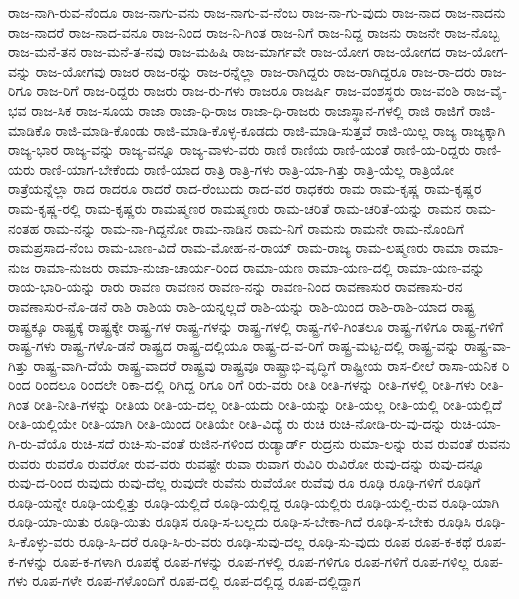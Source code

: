 {ರಾಜ-ನಾಗಿ-ರುವ-ನೆಂದೂ
ರಾಜ-ನಾಗು-ವನು
ರಾಜ-ನಾಗು-ವ-ನೆಂಬ
ರಾಜ-ನಾ-ಗು-ವುದು
ರಾಜ-ನಾದ
ರಾಜ-ನಾದನು
ರಾಜ-ನಾದರೆ
ರಾಜ-ನಾದ-ವನೂ
ರಾಜ-ನಿಂದ
ರಾಜ-ನಿ-ಗಿಂತ
ರಾಜ-ನಿಗೆ
ರಾಜ-ನಿದ್ದ
ರಾಜನು
ರಾಜನೇ
ರಾಜ-ನೊಬ್ಬ
ರಾಜ-ಮನೆ-ತನ
ರಾಜ-ಮನೆ-ತ-ನವು
ರಾಜ-ಮಹಿಷಿ
ರಾಜ-ಮಾರ್ಗವೇ
ರಾಜ-ಯೋಗ
ರಾಜ-ಯೋಗದ
ರಾಜ-ಯೋಗ-ವನ್ನು
ರಾಜ-ಯೋಗವು
ರಾಜರ
ರಾಜ-ರನ್ನು
ರಾಜ-ರನ್ನೆಲ್ಲಾ
ರಾಜ-ರಾಗಿದ್ದರು
ರಾಜ-ರಾಗಿದ್ದರೂ
ರಾಜ-ರಾ-ದರು
ರಾಜ-ರಿಗೂ
ರಾಜ-ರಿಗೆ
ರಾಜ-ರಿದ್ದರು
ರಾಜರು
ರಾಜ-ರು-ಗಳು
ರಾಜರೂ
ರಾಜರ್ಷಿ
ರಾಜ-ವಂಶಸ್ಥರು
ರಾಜ-ವಂಶಿ
ರಾಜ-ವೈ-ಭವ
ರಾಜ-ಸಿಕ
ರಾಜ-ಸೂಯ
ರಾಜಾ
ರಾಜಾ-ಧಿ-ರಾಜ
ರಾಜಾ-ಧಿ-ರಾಜರು
ರಾಜಾಸ್ಥಾನ-ಗಳಲ್ಲಿ
ರಾಜಿ
ರಾಜಿಗೆ
ರಾಜಿ-ಮಾಡಿಕೊ
ರಾಜಿ-ಮಾಡಿ-ಕೊಂಡು
ರಾಜಿ-ಮಾಡಿ-ಕೊಳ್ಳ-ಕೂಡದು
ರಾಜಿ-ಮಾಡಿ-ಸುತ್ತವೆ
ರಾಜಿ-ಯಿಲ್ಲ
ರಾಜ್ಯ
ರಾಜ್ಯಕ್ಕಾಗಿ
ರಾಜ್ಯ-ಭಾರ
ರಾಜ್ಯ-ವನ್ನು
ರಾಜ್ಯ-ವನ್ನೂ
ರಾಜ್ಯ-ವಾಳು-ವರು
ರಾಣಿ
ರಾಣಿಯ
ರಾಣಿ-ಯಂತೆ
ರಾಣಿ-ಯ-ರಿದ್ದರು
ರಾಣಿ-ಯರು
ರಾಣಿ-ಯಾಗ-ಬೇಕೆಂದು
ರಾಣಿ-ಯಾದ
ರಾತ್ರಿ
ರಾತ್ರಿ-ಗಳು
ರಾತ್ರಿ-ಯಾ-ಗಿತ್ತು
ರಾತ್ರಿ-ಯೆಲ್ಲ
ರಾತ್ರಿಯೋ
ರಾತ್ರೆಯನ್ನೆಲ್ಲಾ
ರಾದ
ರಾದರೂ
ರಾದರೆ
ರಾದ-ರೆಂಬುದು
ರಾದ-ವರ
ರಾಧಕರು
ರಾಮ
ರಾಮ-ಕೃಷ್ಣ
ರಾಮ-ಕೃಷ್ಣರ
ರಾಮ-ಕೃಷ್ಣ-ರಲ್ಲಿ
ರಾಮ-ಕೃಷ್ಣರು
ರಾಮಷ್ಮಣರ
ರಾಮಷ್ಮಣರು
ರಾಮ-ಚರಿತೆ
ರಾಮ-ಚರಿತೆ-ಯನ್ನು
ರಾಮನ
ರಾಮ-ನಂತಹ
ರಾಮ-ನನ್ನು
ರಾಮ-ನಾ-ಗಿದ್ದನೋ
ರಾಮ-ನಾಡಿನ
ರಾಮ-ನಿಗೆ
ರಾಮನು
ರಾಮನೇ
ರಾಮ-ನೊಂದಿಗೆ
ರಾಮಪ್ರಸಾದ-ನೆಂಬ
ರಾಮ-ಬಾಣ-ವಿದೆ
ರಾಮ-ಮೋಹ-ನ-ರಾಯ್
ರಾಮ-ರಾಜ್ಯ
ರಾಮ-ಲಷ್ಮಣರು
ರಾಮಾ
ರಾಮಾ-ನುಜ
ರಾಮಾ-ನುಜರು
ರಾಮಾ-ನುಜಾ-ಚಾರ್ಯ-ರಿಂದ
ರಾಮಾ-ಯಣ
ರಾಮಾ-ಯಣ-ದಲ್ಲಿ
ರಾಮಾ-ಯಣ-ವನ್ನು
ರಾಯ-ಭಾರಿ-ಯನ್ನು
ರಾರು
ರಾವಣ
ರಾವಣನ
ರಾವಣ-ನನ್ನು
ರಾವಣ-ನಿಂದ
ರಾವಣಾಸುರ
ರಾವಣಾಸು-ರನ
ರಾವಣಾಸುರ-ನೊ-ಡನೆ
ರಾಶಿ
ರಾಶಿಯ
ರಾಶಿ-ಯನ್ನಲ್ಲದೆ
ರಾಶಿ-ಯನ್ನು
ರಾಶಿ-ಯಿಂದ
ರಾಶಿ-ರಾಶಿ-ಯಾದ
ರಾಷ್ಟ್ರ
ರಾಷ್ಟ್ರಕ್ಕೂ
ರಾಷ್ಟ್ರಕ್ಕೆ
ರಾಷ್ಟ್ರಕ್ಕೇ
ರಾಷ್ಟ್ರ-ಗಳ
ರಾಷ್ಟ್ರ-ಗಳನ್ನು
ರಾಷ್ಟ್ರ-ಗಳಲ್ಲಿ
ರಾಷ್ಟ್ರ-ಗಳಿ-ಗಿಂತಲೂ
ರಾಷ್ಟ್ರ-ಗಳಿಗೂ
ರಾಷ್ಟ್ರ-ಗಳಿಗೆ
ರಾಷ್ಟ್ರ-ಗಳು
ರಾಷ್ಟ್ರ-ಗಳೊ-ಡನೆ
ರಾಷ್ಟ್ರದ
ರಾಷ್ಟ್ರ-ದಲ್ಲಿಯೂ
ರಾಷ್ಟ್ರ-ದ-ವ-ರಿಗೆ
ರಾಷ್ಟ್ರ-ಮಟ್ಟ-ದಲ್ಲಿ
ರಾಷ್ಟ್ರ-ವನ್ನು
ರಾಷ್ಟ್ರ-ವಾ-ಗಿತ್ತು
ರಾಷ್ಟ್ರ-ವಾಗಿ-ದೆಯೆ
ರಾಷ್ಟ್ರ-ವಾದರೆ
ರಾಷ್ಟ್ರವು
ರಾಷ್ಟ್ರವೂ
ರಾಷ್ಟ್ರಾಭಿ-ವೃದ್ಧಿಗೆ
ರಾಷ್ಟ್ರೀಯ
ರಾಸ-ಲೀಲೆ
ರಾಸಾ-ಯನಿಕ
ರಿ
ರಿಂದ
ರಿಂದಲೂ
ರಿಂದಲೇ
ರಿಕಾ-ದಲ್ಲಿ
ರಿಗಿದ್ದ
ರಿಗೂ
ರಿಗೆ
ರಿರು-ವರು
ರೀತಿ
ರೀತಿ-ಗಳನ್ನು
ರೀತಿ-ಗಳಲ್ಲಿ
ರೀತಿ-ಗಳು
ರೀತಿ-ಗಿಂತ
ರೀತಿ-ನೀತಿ-ಗಳನ್ನು
ರೀತಿಯ
ರೀತಿ-ಯ-ದಲ್ಲ
ರೀತಿ-ಯದು
ರೀತಿ-ಯನ್ನು
ರೀತಿ-ಯಲ್ಲ
ರೀತಿ-ಯಲ್ಲಿ
ರೀತಿ-ಯಲ್ಲಿದೆ
ರೀತಿ-ಯಲ್ಲಿಯೇ
ರೀತಿ-ಯಾಗಿ
ರೀತಿ-ಯಿಂದ
ರೀತಿಯೇ
ರೀತಿ-ವಿದ್ಯೆ
ರು
ರುಚಿ
ರುಚಿ-ನೋಡಿ-ರು-ವು-ದನ್ನು
ರುಚಿ-ಯಾ-ಗಿ-ರು-ವೆಯೊ
ರುಚಿ-ಸದೆ
ರುಚಿ-ಸು-ವಂತೆ
ರುಜಿನ-ಗಳಿಂದ
ರುಡ್ಯಾರ್ಡ್
ರುದ್ರನು
ರುಮಾ-ಲನ್ನು
ರುವ
ರುವಂತೆ
ರುವನು
ರುವರು
ರುವರೊ
ರುವರೋ
ರುವ-ವರು
ರುವಷ್ಟೇ
ರುವಾ
ರುವಾಗ
ರುವಿರಿ
ರುವಿರೋ
ರುವು-ದನ್ನು
ರುವು-ದನ್ನೂ
ರುವು-ದ-ರಿಂದ
ರುವುದು
ರುವು-ದೆಲ್ಲ
ರುವುದೇ
ರುವೆನು
ರುವೆಯೋ
ರುವೆವು
ರೂ
ರೂಢಿ
ರೂಢಿ-ಗಳಿಗೆ
ರೂಢಿಗೆ
ರೂಢಿ-ಯನ್ನೇ
ರೂಢಿ-ಯಲ್ಲಿತ್ತು
ರೂಢಿ-ಯಲ್ಲಿದೆ
ರೂಢಿ-ಯಲ್ಲಿದ್ದ
ರೂಢಿ-ಯಲ್ಲಿರು
ರೂಢಿ-ಯಲ್ಲಿ-ರುವ
ರೂಢಿ-ಯಾಗಿ
ರೂಢಿ-ಯಾ-ಯಿತು
ರೂಢಿ-ಯಿತು
ರೂಢಿಸ
ರೂಢಿ-ಸ-ಬಲ್ಲದು
ರೂಢಿ-ಸ-ಬೇಕಾ-ಗಿದೆ
ರೂಢಿ-ಸ-ಬೇಕು
ರೂಢಿಸಿ
ರೂಢಿ-ಸಿ-ಕೊಳ್ಳು-ವರು
ರೂಢಿ-ಸಿ-ದರೆ
ರೂಢಿ-ಸಿ-ರು-ವರು
ರೂಢಿ-ಸುವು-ದಲ್ಲ
ರೂಢಿ-ಸು-ವುದು
ರೂಪ
ರೂಪ-ಕ-ಕಥೆ
ರೂಪ-ಕ-ಗಳನ್ನು
ರೂಪ-ಕ-ಗಳಾಗಿ
ರೂಪಕ್ಕೆ
ರೂಪ-ಗಳನ್ನು
ರೂಪ-ಗಳಲ್ಲಿ
ರೂಪ-ಗಳಿಗೂ
ರೂಪ-ಗಳಿಗೆ
ರೂಪ-ಗಳಿಲ್ಲ
ರೂಪ-ಗಳು
ರೂಪ-ಗಳೇ
ರೂಪ-ಗಳೊಂದಿಗೆ
ರೂಪ-ದಲ್ಲಿ
ರೂಪ-ದಲ್ಲಿದ್ದ
ರೂಪ-ದಲ್ಲಿದ್ದಾಗ
}
